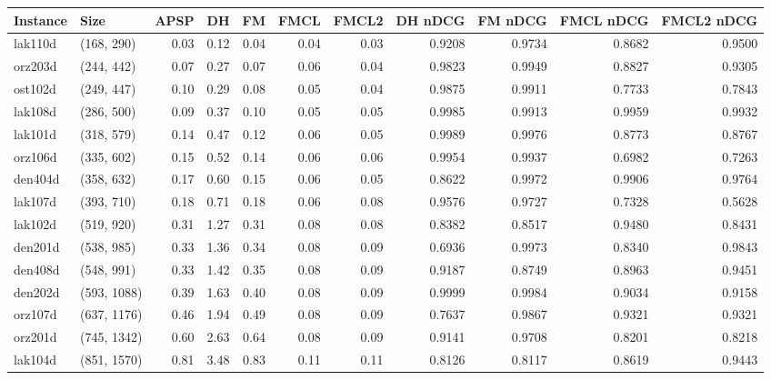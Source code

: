 \begin{tabular}{llrrrrrrrrr}
\toprule
Instance &         Size &  APSP &     DH &    FM &  FMCL &  FMCL2 &  DH nDCG &  FM nDCG &  FMCL nDCG &  FMCL2 nDCG \\
\midrule
 lak110d &   (168, 290) &  0.03 &   0.12 &  0.04 &  0.04 &   0.03 &   0.9208 &   0.9734 &     0.8682 &      0.9500 \\
 orz203d &   (244, 442) &  0.07 &   0.27 &  0.07 &  0.06 &   0.04 &   0.9823 &   0.9949 &     0.8827 &      0.9305 \\
 ost102d &   (249, 447) &  0.10 &   0.29 &  0.08 &  0.05 &   0.04 &   0.9875 &   0.9911 &     0.7733 &      0.7843 \\
 lak108d &   (286, 500) &  0.09 &   0.37 &  0.10 &  0.05 &   0.05 &   0.9985 &   0.9913 &     0.9959 &      0.9932 \\
 lak101d &   (318, 579) &  0.14 &   0.47 &  0.12 &  0.06 &   0.05 &   0.9989 &   0.9976 &     0.8773 &      0.8767 \\
 orz106d &   (335, 602) &  0.15 &   0.52 &  0.14 &  0.06 &   0.06 &   0.9954 &   0.9937 &     0.6982 &      0.7263 \\
 den404d &   (358, 632) &  0.17 &   0.60 &  0.15 &  0.06 &   0.05 &   0.8622 &   0.9972 &     0.9906 &      0.9764 \\
 lak107d &   (393, 710) &  0.18 &   0.71 &  0.18 &  0.06 &   0.08 &   0.9576 &   0.9727 &     0.7328 &      0.5628 \\
 lak102d &   (519, 920) &  0.31 &   1.27 &  0.31 &  0.08 &   0.08 &   0.8382 &   0.8517 &     0.9480 &      0.8431 \\
 den201d &   (538, 985) &  0.33 &   1.36 &  0.34 &  0.08 &   0.09 &   0.6936 &   0.9973 &     0.8340 &      0.9843 \\
 den408d &   (548, 991) &  0.33 &   1.42 &  0.35 &  0.08 &   0.09 &   0.9187 &   0.8749 &     0.8963 &      0.9451 \\
 den202d &  (593, 1088) &  0.39 &   1.63 &  0.40 &  0.08 &   0.09 &   0.9999 &   0.9984 &     0.9034 &      0.9158 \\
 orz107d &  (637, 1176) &  0.46 &   1.94 &  0.49 &  0.08 &   0.09 &   0.7637 &   0.9867 &     0.9321 &      0.9321 \\
 orz201d &  (745, 1342) &  0.60 &   2.63 &  0.64 &  0.08 &   0.09 &   0.9141 &   0.9708 &     0.8201 &      0.8218 \\
 lak104d &  (851, 1570) &  0.81 &   3.48 &  0.83 &  0.11 &   0.11 &   0.8126 &   0.8117 &     0.8619 &      0.9443 \\

\end{tabular}
